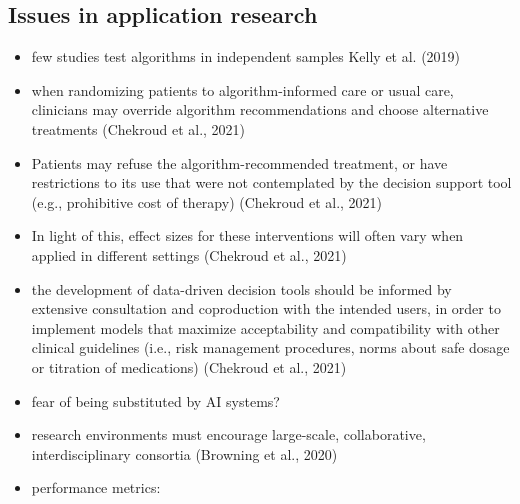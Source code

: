 \documentclass[
  man]{apa7}
\providecommand{\tightlist}{%
  \setlength{\itemsep}{0pt}\setlength{\parskip}{0pt}}
\begin{document}
\hypertarget{issues-in-application-research}{%
\subsection{Issues in application research}\label{issues-in-application-research}}

\begin{itemize}
\tightlist
\item
  few studies test algorithms in independent samples Kelly et al. (2019)
\item
  when randomizing patients to algorithm-informed care or usual care, clinicians may override algorithm recommendations and choose alternative treatments (Chekroud et al., 2021)
\item
  Patients may refuse the algorithm-recommended treatment, or have restrictions to its use that were not contemplated by the decision support tool (e.g., prohibitive cost of therapy) (Chekroud et al., 2021)
\item
  In light of this, effect sizes for these interventions will often vary when applied in different settings (Chekroud et al., 2021)
\item
  the development of data-driven decision tools should be informed by extensive consultation and coproduction with the intended users, in order to implement models that maximize acceptability and compatibility with other clinical guidelines (i.e., risk management procedures, norms about safe dosage or titration of medications) (Chekroud et al., 2021)
\item
  fear of being substituted by AI systems?
\item
  research environments must encourage large-scale, collaborative, interdisciplinary consortia (Browning et al., 2020)
\item
  performance metrics:


\end{itemize}
\end{document}
